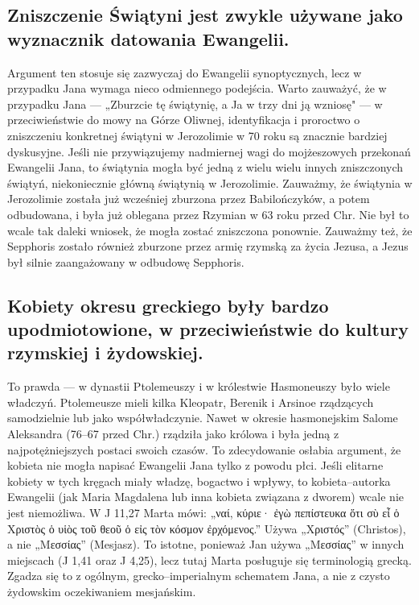 \subsection{Zniszczenie Świątyni jest zwykle używane jako wyznacznik datowania Ewangelii.}\label{subsec:temple-destruction-is-typically-used-as-a-marker-for-the-dating-of-the-gospels.}

Argument ten stosuje się zazwyczaj do Ewangelii synoptycznych, lecz w przypadku Jana wymaga nieco odmiennego podejścia.
Warto zauważyć, że w przypadku Jana — „Zburzcie tę świątynię, a Ja w trzy dni ją wzniosę" — w przeciwieństwie do mowy na Górze Oliwnej, identyfikacja i proroctwo o zniszczeniu konkretnej świątyni w Jerozolimie w 70 roku są znacznie bardziej dyskusyjne.
Jeśli nie przywiązujemy nadmiernej wagi do mojżeszowych przekonań Ewangelii Jana, to świątynia mogła być jedną z wielu wielu innych zniszczonych świątyń, niekoniecznie główną świątynią w Jerozolimie.
Zauważmy, że świątynia w Jerozolimie została już wcześniej zburzona przez Babilończyków, a potem odbudowana, i była już oblegana przez Rzymian w 63 roku przed Chr.
Nie był to wcale tak daleki wniosek, że mogła zostać zniszczona ponownie.
Zauważmy też, że Sepphoris zostało również zburzone przez armię rzymską za życia Jezusa, a Jezus był silnie zaangażowany w odbudowę Sepphoris.

\subsection{Kobiety okresu greckiego były bardzo upodmiotowione, w przeciwieństwie do kultury rzymskiej i żydowskiej.}\label{subsec:the-females-of-the-greek-period-were-very-empowered-but-not-in-roman-and-jewish-culture.}

To prawda --- w dynastii Ptolemeuszy i w królestwie Hasmoneuszy było wiele władczyń.
Ptolemeusze mieli kilka Kleopatr, Berenik i Arsinoe rządzących samodzielnie lub jako współwładczynie.
Nawet w okresie hasmonejskim Salome Aleksandra (76--67 przed Chr.) rządziła jako królowa i była jedną z najpotężniejszych postaci swoich czasów.
To zdecydowanie osłabia argument, że kobieta nie mogła napisać Ewangelii Jana tylko z powodu płci.
Jeśli elitarne kobiety w tych kręgach miały władzę, bogactwo i wpływy, to kobieta–autorka Ewangelii (jak Maria Magdalena lub inna kobieta związana z dworem) wcale nie jest niemożliwa.
W J 11,27 Marta mówi: „ναί, κύριε· ἐγὼ πεπίστευκα ὅτι σὺ εἶ ὁ Χριστὸς ὁ υἱὸς τοῦ θεοῦ ὁ εἰς τὸν κόσμον ἐρχόμενος.”
Używa „Χριστός” (Christos), a nie „Μεσσίας” (Mesjasz).
To istotne, ponieważ Jan używa „Μεσσίας” w innych miejscach (J 1,41 oraz J 4,25), lecz tutaj Marta posługuje się terminologią grecką.
Zgadza się to z ogólnym, grecko–imperialnym schematem Jana, a nie z czysto żydowskim oczekiwaniem mesjańskim.

